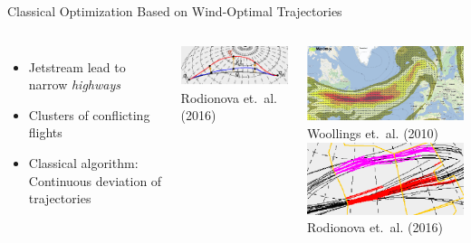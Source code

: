 \documentclass[10pt]{beamer}
\begin{document}
\begin{frame}[t]{Classical Optimization Based on Wind-Optimal Trajectories}
	\begin{columns}[c]
            \begin{itemize}
                \item Jetstream lead to narrow \emph{highways}
                \item Clusters of conflicting flights 
                \item Classical algorithm: Continuous deviation of trajectories
            \end{itemize}
            \begin{center}
                \includegraphics[width=1.0\textwidth]{images/classical_conflict_avoidance_half.png} \\
                \tiny{Rodionova et.\ al. (2016)}
            \end{center}
            \begin{center}
                \includegraphics[width=1.0\textwidth]{images/classical_jetstream.png} \\
                \tiny{Woollings et.\ al. (2010)}
                \includegraphics[width=1.0\textwidth]{images/classical_conflicts.png} \\
                \tiny{Rodionova et.\ al. (2016)}
            \end{center}
	\end{columns}
\end{frame}
\end{document}
